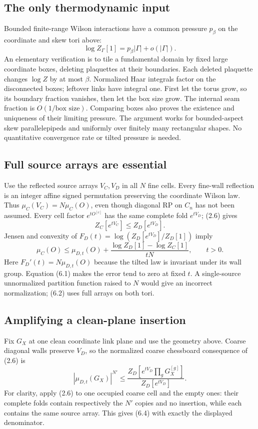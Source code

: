 \documentclass[11pt]{article}
\theoremstyle{remark}
\begin{document}
\subsection{The only thermodynamic input}
Bounded finite-range Wilson interactions have a common pressure
$p_\beta$ on the coordinate and skew tori above:
\[
 \log Z_\Gamma[1]=p_\beta|\Gamma|+o(|\Gamma|).
 \tag{6.1}
\]
An elementary verification is to tile a fundamental domain by fixed
large coordinate boxes, deleting plaquettes at their boundaries.
Each deleted plaquette changes $\log Z$ by at most $\beta$.
Normalized Haar integrals factor on the disconnected boxes; leftover
links have integral one. First let the torus grow, so its boundary
fraction vanishes, then let the box size grow. The internal seam
fraction is $O(1/\text{box size})$. Comparing boxes also proves the
existence and uniqueness of their limiting pressure. The argument
works for bounded-aspect skew parallelepipeds and uniformly over
finitely many rectangular shapes. No quantitative convergence rate
or tilted pressure is needed.

\subsection{Full source arrays are essential}
Use the reflected source arrays $V_C,V_D$ in all $N$ fine cells.
Every fine-wall reflection is an integer affine signed permutation
preserving the coordinate Wilson law. Thus
$\mu_C(V_C)=N\mu_C(O)$, even though diagonal RP on $C_n$ has
not been assumed. Every cell factor $e^{tO^{[c]}}$ has the same
complete fold $e^{tV_D}$; (2.6) gives
\[
 Z_C[e^{tV_C}]\le Z_D[e^{tV_D}].
 \tag{6.2}
\]
Jensen and convexity of
$F_D(t)=\log(Z_D[e^{tV_D}]/Z_D[1])$ imply
\[
 \mu_C(O)\le\mu_{D,t}(O)
 +\frac{\log Z_D[1]-\log Z_C[1]}{tN},\qquad t>0.
 \tag{6.3}
\]
Here $F_D'(t)=N\mu_{D,t}(O)$ because the tilted law is invariant
under its wall group. Equation (6.1) makes the error tend to zero
at fixed $t$. A single-source unnormalized partition function raised
to $N$ would give an incorrect normalization; (6.2) uses full arrays
on both tori.

\subsection{Amplifying a clean-plane insertion}
Fix $G_X$ at one clean coordinate link plane and use the geometry
above. Coarse diagonal walls preserve $V_D$, so the normalized
coarse chessboard consequence of (2.6) is
\[
 |\mu_{D,t}(G_X)|^{N'}
 \le\frac{Z_D[e^{tV_D}\prod_gG_X^{[g]}]}{Z_D[e^{tV_D}]}.
 \tag{6.4}
\]
For clarity, apply (2.6) to one occupied coarse cell and the empty
ones: their complete folds contain respectively the $N'$ copies
and no insertion, while each contains the same source array.
This gives (6.4) with exactly the displayed denominator.
\end{document}
